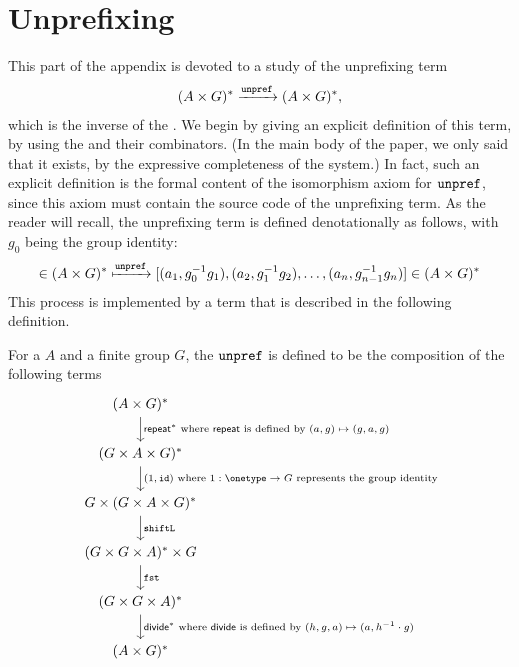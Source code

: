 \section{Unprefixing}
\label{sec:unprefix-commutes-with-concat}

\newcommand{\functor}{\mathsf T}
\newcommand{\functorplus}{\mathsf T_{\!+}}
\newcommand{\inject}{\mathsf{rep}}
\newcommand{\groupid}{1}
\newcommand{\groupdiag}{\mathsf{repeat}}
\newcommand{\groupdiv}{\mathsf{divide}}

This part of the appendix is devoted to a study of the unprefixing term 
\begin{align*}
(A \times G)^* \xrightarrow {\mathtt{unpref}} (A \times G)^*,
\end{align*}
which is the inverse of the . We begin by giving an explicit definition of this term, by using the  and their combinators. (In the main body of the paper, we only said that it exists, by the expressive completeness of the system.) In fact, such an explicit definition is the formal content of the isomorphism axiom for $\mathtt{unpref}$, since this axiom must contain the source code of the unprefixing term.  As the reader will recall, the unprefixing term is defined denotationally as follows, with $g_0$ being the group identity:
\begin{align*}
[(a_1,g_1),\ldots,(a_n,g_n)] \in (A \times G)^* \xmapsto \unprefterm  [(a_1,g_0^{-1} g_1), (a_2,g_1^{-1} g_2), \ldots, (a_n,g_{n-1}^{-1} g_n)] \in (A \times G)^*
\end{align*}
This process is implemented by a term that is  described in the following definition.

\begin{definition}\label{def:unprefterm}
    For a  $A$ and a finite group $G$, the  $\mathtt{unpref}$ is defined to be  the composition of the following terms
    \[
    \begin{tikzcd}
        (A \times G)^* 
        \ar[d,"\text{$\groupdiag^*$ where $\groupdiag$ is defined by $(a,g) \mapsto (g,a,g)$}"]\\
        (G \times A \times G)^*
        \ar[d,"\text{$(\groupid, \idterm)$ where $\groupid : \onetype \to G$ represents the group identity}"]\\
    G \times (G \times A \times G)^*
    \ar[d,"\shiftlterm"]\\
    (G \times G \times A)^* \times G
    \ar[d,"\fstterm"]
    \\
    (G \times G \times A)^*
            \ar[d,"\text{$\groupdiv^*$ where $\groupdiv$ is defined by $(h,g,a) \mapsto (a,h^{-1} \cdot g)$}"]
    \\
    (A \times G)^*
    \end{tikzcd}
    \]
\end{definition}


